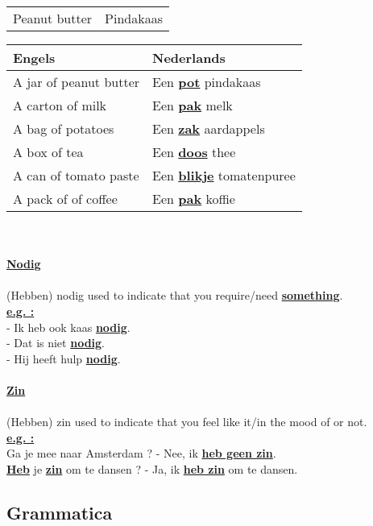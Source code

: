 \documentclass[a4paper,14pt]{extarticle}
\newcommand{\emp}[1]{\underline{\textbf{#1}}}
\begin{document}
\begin{paracol}{2}
\begin{tabularx}{200pt}{ p{100pt} p{100pt} }
 Peanut butter & Pindakaas \\
\end{tabularx}
\switchcolumn
\begin{tabularx}{200pt}{ p{100pt} p{100pt} }
 \hline
 Engels & Nederlands\\
 \hline
 A jar of peanut butter & Een \emp{pot} pindakaas \\
 A carton of milk & Een \emp{pak} melk \\
 A bag of potatoes & Een \emp{zak} aardappels \\
 A box of tea & Een \emp{doos} thee \\
 A can of tomato paste & Een \emp{blikje} tomatenpuree \\
 A pack of of coffee & Een \emp{pak} koffie \\
\end{tabularx}
\hfill \\ \\
\emp{Nodig} \\ \\
(Hebben) nodig used to indicate that you require/need \emp{something}. \\
\emp{e.g. : } \\
- Ik heb ook kaas \emp{nodig}. \\
- Dat is niet \emp{nodig}. \\
- Hij heeft hulp \emp{nodig}. \\ \\
\emp {Zin} \\ \\
(Hebben) zin used to indicate that you feel like it/in the mood of or not. \\
\emp{e.g. : } \\
Ga je mee naar Amsterdam ? - Nee, ik \emp{heb geen zin}. \\
\emp{Heb} je \emp{zin} om te dansen ? - Ja, ik \emp{heb zin} om te dansen. \\
\end{paracol}
\newpage
\subsection{Grammatica}
\end{document}
